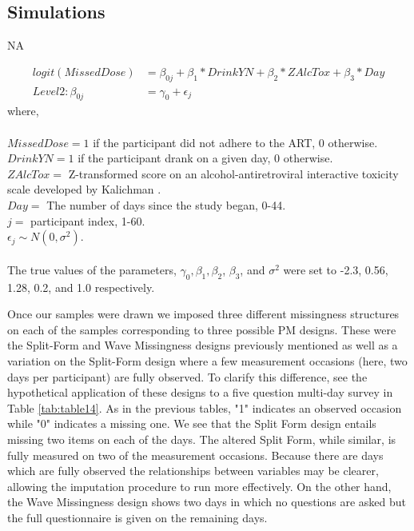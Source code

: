 \documentclass{svjour3}                     %
\begin{document}
\subsection{Simulations}
\label{sec:2.2}
NA

\begin{align*}
logit(MissedDose) &= \beta_{0j} + \beta_1*DrinkYN + \beta_2*ZAlcTox +\beta_3*Day \\
Level 2: \beta_{0j} &= \gamma_0 + \epsilon_j
\end{align*}
where, \\ \\
$MissedDose = 1$ if the participant did not adhere to the ART, 0 otherwise. \\
$DrinkYN = 1$ if the participant drank on a given day, 0 otherwise.\\
$ZAlcTox =$ Z-transformed score on an alcohol-antiretroviral interactive toxicity scale developed by Kalichman \cite{kalichman2009prevalence}. \\
$Day =$ The number of days since the study began, 0-44. \\
$j =$ participant index, 1-60. \\
$\epsilon_j  \sim N(0, \sigma^2)$. \\ \\


The true values of the parameters, $\gamma_0, \beta_1, \beta_2$, $\beta_3$, and $\sigma^2$ were set to -2.3, 0.56, 1.28, 0.2, and 1.0 respectively. \par
Once our samples were drawn we imposed three different missingness structures on each of the samples corresponding to three possible PM designs. These were the Split-Form and Wave Missingness designs previously mentioned as well as a variation on the Split-Form design where a few measurement occasions (here, two days per participant) are fully observed. To clarify this difference, see the hypothetical application of these designs to a five question multi-day survey in Table \ref{tab:table14}. As in the previous tables, "1" indicates an observed occasion while "0" indicates a missing one. We see that the Split Form design entails missing two items on each of the days. The altered Split Form, while similar, is fully measured on two of the measurement occasions. Because there are days which are fully observed the relationships between variables may be clearer, allowing the imputation procedure to run more effectively. On the other hand, the Wave Missingness design shows two days in which no questions are asked but the full questionnaire is given on the remaining days. \par
\end{document}
